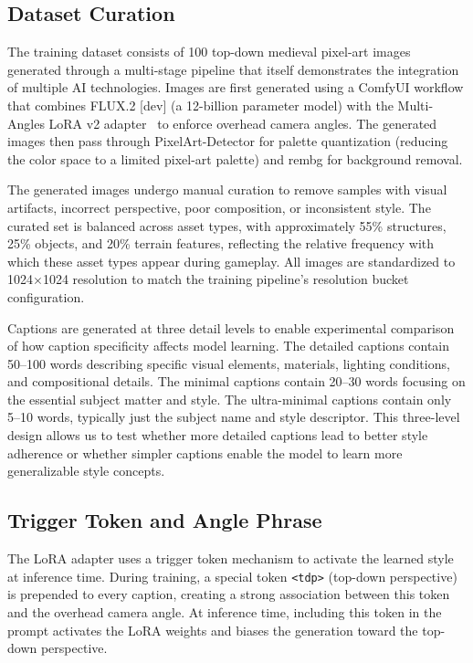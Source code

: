 \documentclass[conference]{IEEEtran}
\begin{document}
\subsection{Dataset Curation}

The training dataset consists of 100 top-down medieval pixel-art images generated through a multi-stage pipeline that itself demonstrates the integration of multiple AI technologies. Images are first generated using a ComfyUI workflow that combines FLUX.2 [dev] (a 12-billion parameter model) with the Multi-Angles LoRA v2 adapter~\cite{lovis93_2024_multiangles} to enforce overhead camera angles. The generated images then pass through PixelArt-Detector for palette quantization (reducing the color space to a limited pixel-art palette) and rembg for background removal.

The generated images undergo manual curation to remove samples with visual artifacts, incorrect perspective, poor composition, or inconsistent style. The curated set is balanced across asset types, with approximately 55\% structures, 25\% objects, and 20\% terrain features, reflecting the relative frequency with which these asset types appear during gameplay. All images are standardized to 1024$\times$1024 resolution to match the training pipeline's resolution bucket configuration.

Captions are generated at three detail levels to enable experimental comparison of how caption specificity affects model learning. The detailed captions contain 50--100 words describing specific visual elements, materials, lighting conditions, and compositional details. The minimal captions contain 20--30 words focusing on the essential subject matter and style. The ultra-minimal captions contain only 5--10 words, typically just the subject name and style descriptor. This three-level design allows us to test whether more detailed captions lead to better style adherence or whether simpler captions enable the model to learn more generalizable style concepts.

\subsection{Trigger Token and Angle Phrase}

The LoRA adapter uses a trigger token mechanism to activate the learned style at inference time. During training, a special token \texttt{<tdp>} (top-down perspective) is prepended to every caption, creating a strong association between this token and the overhead camera angle. At inference time, including this token in the prompt activates the LoRA weights and biases the generation toward the top-down perspective.
\end{document}
